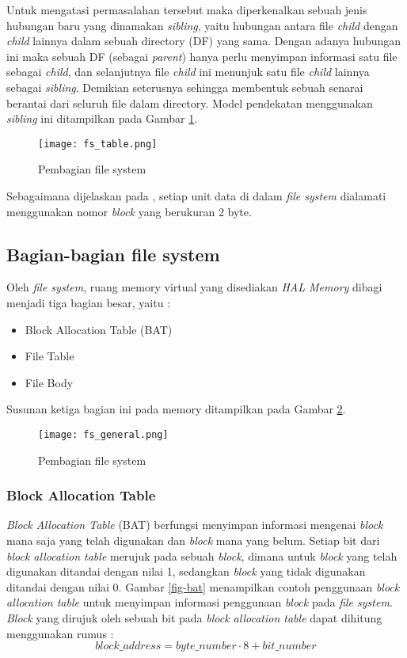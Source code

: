 \documentclass[a4paper, 12pt]{report}
\begin{document}
Untuk mengatasi permasalahan tersebut maka diperkenalkan sebuah jenis hubungan baru yang dinamakan {\em sibling}, yaitu hubungan antara file {\em child} dengan {\em child} lainnya dalam sebuah directory (DF) yang sama. Dengan adanya hubungan ini maka sebuah DF (sebagai {\em parent}) hanya perlu menyimpan informasi satu file sebagai {\em child}, dan selanjutnya file {\em child} ini menunjuk satu file {\em child} lainnya sebagai {\em sibling}. Demikian seterusnya sehingga membentuk sebuah senarai berantai dari seluruh file dalam directory. Model pendekatan menggunakan {\em sibling} ini ditampilkan pada Gambar \ref{fig-file-relation}.

\begin{figure}[h]
\centering
\texttt{[image: fs\_table.png]}
\caption{Pembagian file system}
\label{fig-file-relation}
\end{figure}

Sebagaimana dijelaskan pada , setiap unit data di dalam {\em file system} dialamati menggunakan nomor {\em block} yang berukuran 2 byte. 

\subsection{Bagian-bagian file system}
\label{fs-partitioning}

Oleh {\em file system}, ruang memory virtual yang disediakan {\em HAL Memory} dibagi menjadi tiga bagian besar, yaitu :
\begin{itemize}
\item Block Allocation Table (BAT)
\item File Table
\item File Body
\end{itemize}

Susunan ketiga bagian ini pada memory ditampilkan pada Gambar \ref{fig-fs-partition}.

\begin{figure}[h]
\centering
\texttt{[image: fs\_general.png]}
\caption{Pembagian file system}
\label{fig-fs-partition}
\end{figure}

\subsubsection{Block Allocation Table}

{\em Block Allocation Table} (BAT) berfungsi menyimpan informasi mengenai {\em block} mana saja yang telah digunakan dan {\em block} mana yang belum. Setiap bit dari {\em block allocation table} merujuk pada sebuah {\em block}, dimana untuk {\em block} yang telah digunakan ditandai dengan nilai 1, sedangkan {\em block} yang tidak digunakan ditandai dengan nilai 0. Gambar \ref{fig-bat} menampilkan contoh penggunaan {\em block allocation table} untuk menyimpan informasi penggunaan {\em block} pada {\em file system}. {\em Block} yang dirujuk oleh sebuah bit pada {\em block allocation table} dapat dihitung menggunakan rumus :
$$
block\_address=byte\_number\cdot8+bit\_number
$$
\end{document}
